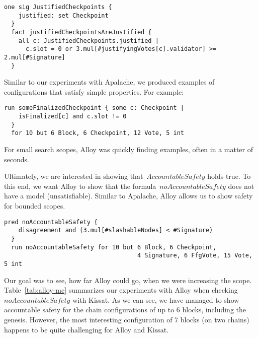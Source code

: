 \begin{lstlisting}[language=alloy,columns=fullflexible]
  one sig JustifiedCheckpoints {
    justified: set Checkpoint
  }
  fact justifiedCheckpointsAreJustified {
    all c: JustifiedCheckpoints.justified |
      c.slot = 0 or 3.mul[#justifyingVotes[c].validator] >= 2.mul[#Signature]
  }
\end{lstlisting}

Similar to our experiments with Apalache, we produced examples of configurations
that satisfy simple properties. For example:

\begin{lstlisting}[language=alloy,columns=fullflexible]
  run someFinalizedCheckpoint { some c: Checkpoint |
    isFinalized[c] and c.slot != 0
  }
  for 10 but 6 Block, 6 Checkpoint, 12 Vote, 5 int
\end{lstlisting}

For small search scopes, Alloy was quickly finding examples, often in a matter
of seconds.

Ultimately, we are interested in showing that~$\textit{AccountableSafety}$
holds true. To this end, we want Alloy to show that the
formula~$\textit{noAccountableSafety}$ does not have a model (unsatisfiable).
Similar to Apalache, Alloy allows us to show safety for bounded scopes.

\begin{lstlisting}[language=alloy,columns=fullflexible]
  pred noAccountableSafety {
    disagreement and (3.mul[#slashableNodes] < #Signature)
  }
  run noAccountableSafety for 10 but 6 Block, 6 Checkpoint,
                                     4 Signature, 6 FfgVote, 15 Vote, 5 int
\end{lstlisting}

Our goal was to see, how far Alloy could go, when we were increasing the scope.
Table~\ref{tab:alloy-mc} summarizes our experiments with Alloy when checking
$\textit{noAccountableSafety}$ with Kissat. As we can see, we have managed to
show accountable safety for the chain configurations of up to 6 blocks,
including the genesis. However, the most interesting configuration of 7 blocks
(on two chains) happens to be quite challenging for Alloy and Kissat.

